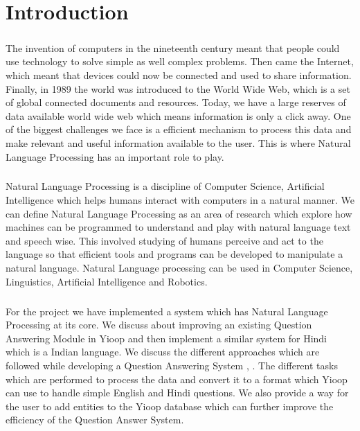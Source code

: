 \chapter{Introduction}

\paragraph{}
The invention of computers in the nineteenth century meant that people could use technology to solve simple as well complex problems. Then came the Internet, which meant that devices could now be connected and used to share information. Finally, in 1989 the world was introduced to the World Wide Web, which is a set of global connected documents and resources. Today, we have a large reserves of data available world wide web which means information is only a click away. One of the biggest challenges we face is a efficient mechanism to process this data and make relevant and useful information available to the user. This is where Natural Language Processing \cite{chowdhury2003natural} has an important role to play.

\paragraph{}
Natural Language Processing is a discipline of Computer Science, Artificial Intelligence which helps humans interact with computers in a natural manner. We can define Natural Language Processing as an area of research which explore how machines can be programmed to understand and play with natural language text and speech wise. This involved studying of humans perceive and act to the language so that efficient tools and programs can be developed to manipulate a natural language. Natural Language processing can be used in Computer Science, Linguistics, Artificial Intelligence and Robotics. 

\paragraph{}
For the project we have implemented a system which has Natural Language Processing at its core. We discuss about improving an existing Question Answering Module \cite {patel2015question} in Yioop and then implement a similar system for Hindi which is a Indian language. We discuss the different approaches which are followed while developing a Question Answering System \cite {simmons1970natural}, \cite{waltz1978english}. The different tasks which are performed to process the data and convert it to a format which Yioop can use to handle simple English and Hindi questions. We also provide a way for the user to add entities to the Yioop database which can further improve the efficiency of the Question Answer System.
